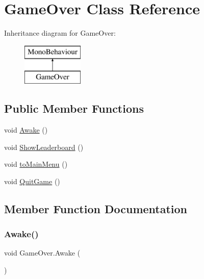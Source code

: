 \hypertarget{class_game_over}{}\section{Game\+Over Class Reference}
\label{class_game_over}
Inheritance diagram for Game\+Over\+:\begin{figure}[H]
\begin{center}
\leavevmode
\includegraphics[height=2.000000cm]{class_game_over}
\end{center}
\end{figure}
\subsection*{Public Member Functions}
\begin{DoxyCompactItemize}
\item 
void \mbox{\hyperlink{class_game_over_a9fef6c386d51e0cea3c9d4f941c66289}{Awake}} ()
\item 
void \mbox{\hyperlink{class_game_over_a01c0b3e1f8612df9ebd5675ba0719beb}{Show\+Leaderboard}} ()
\item 
void \mbox{\hyperlink{class_game_over_af7a0b3719580737182a952c8fb487232}{to\+Main\+Menu}} ()
\item 
void \mbox{\hyperlink{class_game_over_a252e97e89fa007889c2a9fb4a2f9b06c}{Quit\+Game}} ()
\end{DoxyCompactItemize}


\subsection{Member Function Documentation}
\mbox{\label{class_game_over_a9fef6c386d51e0cea3c9d4f941c66289}} 
\subsubsection{\texorpdfstring{Awake()}{Awake()}}
{\footnotesize\ttfamily void Game\+Over.\+Awake (\begin{DoxyParamCaption}{ }\end{DoxyParamCaption})\hspace{0.3cm}{\ttfamily [inline]}}

